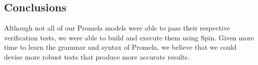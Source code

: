 \documentclass[12pt]{article}
\begin{document}
\begin{flushleft}
\section{Conclusions}
Although not all of our Promela models were able to pass their respective
verification tests, we were able to build and execute them using Spin. Given
more time to learn the grammar and syntax of Promela, we believe that we could
devise more robust tests that produce more accurate results.

\printbibliography
\end{flushleft}
\end{document}
